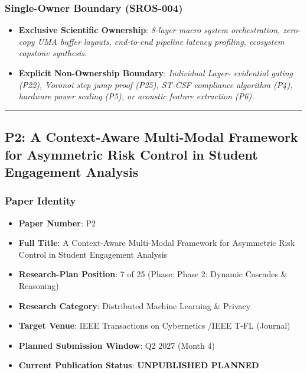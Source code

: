 \documentclass[11pt,letterpaper]{article}
\begin{document}
\subsubsection{Single-Owner Boundary (SROS-004)}
\begin{itemize}[leftmargin=*]
    \item \textbf{Exclusive Scientific Ownership}: \textit{8-\allowbreak layer macro system orchestration, zero-\allowbreak copy UMA buffer layouts, end-\allowbreak to-\allowbreak end pipeline latency profiling, ecosystem capstone synthesis.}
    \item \textbf{Explicit Non-Ownership Boundary}: \textit{Individual Layer- evidential gating (P22), Voronoi step jump proof (P25), ST-\allowbreak CSF compliance algorithm (P4), hardware power scaling (P5), or acoustic feature extraction (P6).}
\end{itemize}

\vspace{0.4cm}
\hrule

\subsection{P2: A Context-\allowbreak Aware Multi-\allowbreak Modal Framework for Asymmetric Risk Control in Student Engagement Analysis}
\label{sec:profile_p2}

\subsubsection{Paper Identity}
\begin{itemize}[leftmargin=*]
    \item \textbf{Paper Number}: P2
    \item \textbf{Full Title}: A Context-\allowbreak Aware Multi-\allowbreak Modal Framework for Asymmetric Risk Control in Student Engagement Analysis
    \item \textbf{Research-Plan Position}: 7 of 25 (Phase: Phase 2: Dynamic Cascades \& Reasoning)
    \item \textbf{Research Category}: Distributed Machine Learning \& Privacy
    \item \textbf{Target Venue}: IEEE Transactions on Cybernetics /\allowbreak  IEEE T-\allowbreak FL (Journal)
    \item \textbf{Planned Submission Window}: Q2 2027 (Month 4)
    \item \textbf{Current Publication Status}: \textbf{UNPUBLISHED PLANNED}
\end{itemize}
\end{document}
